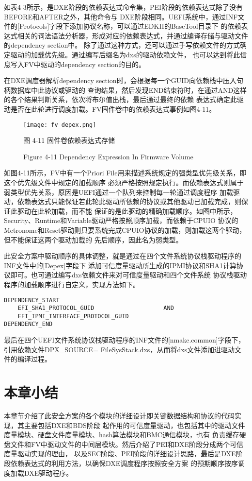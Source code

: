 如表4-3所示，是DXE阶段的依赖表达式命令集，PEI阶段的依赖表达式除了没有BEFORE和AFTER之外，其他命令与
DXE阶段相同。UEFI系统中，通过INF文件的[Protocols]字段下添加协议名称，可以通过EDKII的BaseTool目录下
的依赖表达式相关的词法语法分析器，形成对应的依赖表达式，并通过编译存储与驱动文件的dependency section中。
除了通过这种方式，还可以通过手写依赖文件的方式确定驱动的加载优先级。通过编写后缀名为dxs的驱动依赖文件，
也可以达到将此信息写入FV中驱动的dependency section的目的。
\par 在DXE调度器解析dependency section时，会根据每一个GUID向依赖栈中压入句柄数据库中此协议或驱动的
查询结果，然后发现END结束符时，在通过AND这样的各个结果判断关系，依次将布尔值出栈，最后通过最终的依赖
表达式确定此驱动是否在此轮进行调度加载。FV固件卷中的依赖表达式事例如图4-11。

\begin{figure}[htb]
    \vspace{0cm}   
    \setlength{\abovecaptionskip}{0.3cm}
	\centering
    \texttt{[image: fv\_depex.png]}
    \caption*{图 4-11 固件卷依赖表达式存储}
    \setlength{\belowcaptionskip}{-0.7cm}
    \caption*{Figure 4-11 Dependency Expression In Firmware Volume}
\end{figure}

如图4-11所示，FV中有一个Priori File用来描述系统规定的强类型优先级关系，即这个优先级文件中规定的加载顺序
必须严格按照规定执行。而依赖表达式则属于弱类型优先关系，原因是UEFI通过一个队列来控制每一轮通过调度程序
加载驱动，依赖表达式只能保证若此轮此驱动所依赖的协议或其他驱动已加载完成，则保证此驱动在此轮加载，而不能
保证的是此驱动的精确加载顺序。如图中所示，Security、Runtime和Variable驱动严格按照顺序加载，而依赖于CPUIO
协议的Metronome和Reset驱动则只要系统完成CPUIO协议的加载，则加载这两个驱动，但不能保证这两个驱动加载的
先后顺序，因此名为弱类型。
\par 此安全方案中驱动顺序的具体调整，就是通过在四个文件系统协议栈驱动程序的INF文件中的[Depex]字段下
添加可信度量驱动所生成的IPMI协议和SHA1计算协议即可。也可通过编写dxs依赖文件来对可信度量驱动和四个文件系统
协议栈驱动程序的加载顺序进行自定义，实现方法如下。

\begin{lstlisting}
DEPENDENCY_START
    EFI_SHA1_PROTOCOL_GUID                    AND
    EFI_IPMI_INTERFACE_PROTOCOL_GUID
DEPENDENCY_END
\end{lstlisting}
\par 最后在四个UEFI文件系统协议栈驱动程序的INF文件的[nmake.common]字段下，引用依赖文件DPX\_SOURCE=
FileSysStack.dxs，从而将dxs文件添加进驱动文件的编译过程。

%
%
\section{本章小结}
本章节介绍了此安全方案的各个模块的详细设计即关键数据结构和协议的代码实现，其主要包括DXE和BDS阶段
起作用的可信度量驱动，也包括其中的驱动文件度量模块、硬盘文件度量模块、hash算法模块和BMC通信模块，也有
负责缓存硬盘文件和FV中驱动文件的中间层模块。然后介绍了PEI和DXE阶段分成两个可信度量驱动实现的理由，
以及SEC阶段、PEI阶段的详细设计思路，最后是DXE阶段依赖表达式的利用方法，以确保DXE调度程序按照安全方案
的预期顺序按序调度加载DXE驱动程序。

\bjutclearpage